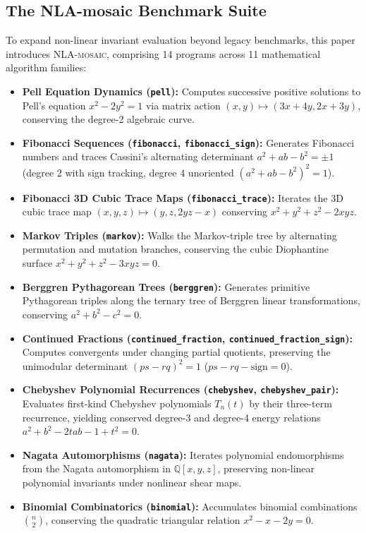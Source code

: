 \documentclass[runningheads]{llncs}
\newcommand{\code}[1]{\texttt{\small #1}}
\begin{document}
\subsection{The NLA-mosaic Benchmark Suite}
\label{sec:appendix_mosaic}
To expand non-linear invariant evaluation beyond legacy benchmarks, this paper introduces \textsc{NLA-mosaic}, comprising 14 programs across 11 mathematical algorithm families:
\begin{itemize}[leftmargin=1.5em,itemsep=2pt]
\item \textbf{Pell Equation Dynamics (\code{pell}):} Computes successive positive solutions to Pell's equation $x^2 - 2y^2 = 1$ via matrix action $(x,y) \mapsto (3x+4y, 2x+3y)$, conserving the degree-2 algebraic curve.
\item \textbf{Fibonacci Sequences (\code{fibonacci}, \allowbreak\code{fibonacci\_sign}):} Generates Fibonacci numbers and traces Cassini's alternating determinant $a^2 + ab - b^2 = \pm 1$ (degree 2 with sign tracking, degree 4 unoriented $(a^2+ab-b^2)^2 = 1$).
\item \textbf{Fibonacci 3D Cubic Trace Maps (\code{fibonacci\_trace}):} Iterates the 3D cubic trace map $(x,y,z) \mapsto (y,z,2yz-x)$ conserving $x^2+y^2+z^2-2xyz$.
\item \textbf{Markov Triples (\code{markov}):} Walks the Markov-triple tree by alternating permutation and mutation branches, conserving the cubic Diophantine surface $x^2 + y^2 + z^2 - 3xyz = 0$.
\item \textbf{Berggren Pythagorean Trees (\code{berggren}):} Generates primitive Pythagorean triples along the ternary tree of Berggren linear transformations, conserving $a^2 + b^2 - c^2 = 0$.
\item \textbf{Continued Fractions (\code{continued\_fraction}, \allowbreak\code{continued\_fraction\_sign}):} Computes convergents under changing partial quotients, preserving the unimodular determinant $(ps - rq)^2 = 1$ ($ps - rq - \text{sign} = 0$).
\item \textbf{Chebyshev Polynomial Recurrences (\code{chebyshev}, \allowbreak\code{chebyshev\_pair}):} Evaluates first-kind Chebyshev polynomials $T_n(t)$ by their three-term recurrence, yielding conserved degree-3 and degree-4 energy relations $a^2 + b^2 - 2tab - 1 + t^2 = 0$.
\item \textbf{Nagata Automorphisms (\code{nagata}):} Iterates polynomial endomorphisms from the Nagata automorphism in $\mathbb{Q}[x,y,z]$, preserving non-linear polynomial invariants under nonlinear shear maps.
\item \textbf{Binomial Combinatorics (\code{binomial}):} Accumulates binomial combinations $\binom{n}{2}$, conserving the quadratic triangular relation $x^2 - x - 2y = 0$.

\end{itemize}
\end{document}
